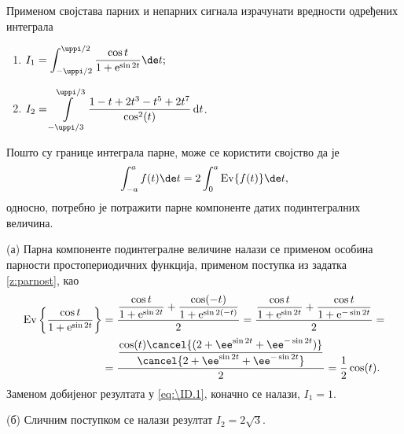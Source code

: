 \PID 
Применом својстава парних и непарних 
сигнала
израчунати вредности 
одређених интеграла 
\begin{multicols}{2}
\begin{enumerate}[label=(\alph*)]
\item
$\displaystyle 
I_1 = 
\int_{-\uppi/2}^{\uppi/2}
\dfrac{\cos t}{1 + {\rm e}^{\sin 2t}}
 \de t;
$

\item
$\displaystyle
I_2 = \int\limits_{-\uppi/3}^{\uppi/3}
\dfrac{1 - t + 2t^3 - t^5 + 2t^7}{\cos^2 (t)}\,{\rm d} t$.
\end{enumerate}
\end{multicols}

\RESENJE 
Пошто су границе интеграла парне, може се користити својство да је 
\begin{equation}
\displaystyle \int_{-a}^{a} f(t) \de t = 2\int_{0}^{a} {\rm Ev}\{f(t)\} \de t, \label{eq:\ID.1}
\end{equation}
односно, потребно је потражити парне компоненте датих подинтегралних величина. 

(а) Парна компоненте подинтегралне величине налази се применом особина парности простопериодичних функција, 
применом поступка из задатка \ref{z:parnost}, као 
\begin{eqnarray}
    {\rm Ev}\left\{  
        \dfrac{\cos t}{1 + {\rm e}^{\sin 2t}}
    \right\}
    &= \dfrac{
        \dfrac{\cos t}{1 + {\rm e}^{\sin 2t}} + \dfrac{\cos (-t)}{1 + {\rm e}^{\sin 2(-t)}}
    }{2}
    =
    \dfrac{
        \dfrac{\cos t}{1 + {\rm e}^{\sin 2t}} + \dfrac{\cos t}{1 + {\rm e}^{-\sin 2t}}
    }{2}
    =  \\
    &= \dfrac{ \dfrac{\cos(t) \cancel{( 2 + \ee^{\sin 2t} + \ee^{-\sin 2t} )} } { \cancel{2 + \ee^{\sin 2t} + \ee^{-\sin 2t}} } }{2}
    = \dfrac{1}{2} \cos(t).
\end{eqnarray}
Заменом добијеног резултата у \eqref{eq:\ID.1}, коначно се налази, $I_1 = 1$.

(б) Сличним поступком се налази резултат $I_2 = 2\sqrt 3$.
